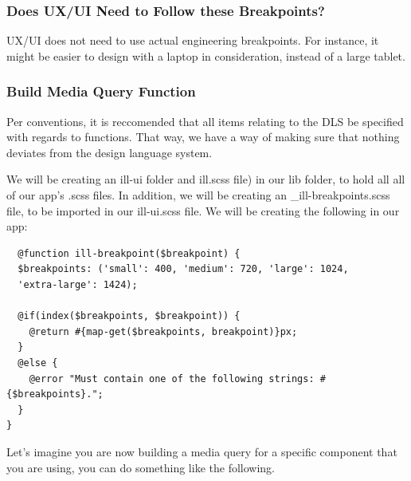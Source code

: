 \subsubsection{ Does UX/UI Need to Follow these Breakpoints? }
UX/UI does not need to use actual engineering breakpoints. For instance,
it might be easier to design with a laptop in consideration, instead of a large
tablet.

\subsubsection{ Build Media Query Function }
Per conventions, it is reccomended that all items relating to the DLS be
specified with regards to functions. That way, we have a way of making sure
that nothing deviates from the design language system.

We will be creating an ill-ui folder and ill.scss file) in our lib folder, to
hold all all of our app's .scss files. In addition, we will be creating an
 \_ill-breakpoints.scss file, to be imported in our ill-ui.scss file. We will be
creating the following in our app:

\begin{verbatim}
  @function ill-breakpoint($breakpoint) {
  $breakpoints: ('small': 400, 'medium': 720, 'large': 1024,
  'extra-large': 1424);

  @if(index($breakpoints, $breakpoint)) {
    @return #{map-get($breakpoints, breakpoint)}px;
  }
  @else {
    @error "Must contain one of the following strings: #{$breakpoints}.";
  }
}
\end{verbatim}

Let's imagine you are now building a media query for a specific component
that you are using, you can do something like the following.
